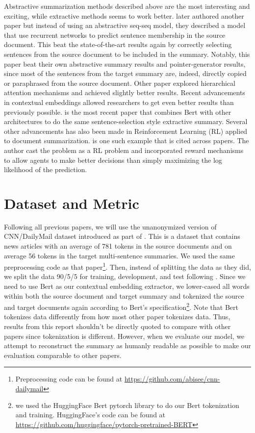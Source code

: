 \documentclass[11pt,a4paper]{article}
\begin{document}
Abstractive summarization methods described above are the most interesting and exciting, while extractive methods seems to work better.  \citet{SummaRuNNer} later authored another paper but instead of using an abstractive seq-seq model, they described a model that use recurrent networks to predict sentence membership in the source document. This beat the state-of-the-art results again by correctly selecting sentences from the source document to be included in the summary. Notably, this paper beat their own abstractive summary results and pointer-generator results, since most of the sentences from the target summary are, indeed, directly copied or paraphrased from the source document. Other paper explored hierarchical attention mechanisms \cite{al2018hierarchical} and achieved slightly better results. Recent advancements in contextual embeddings allowed researchers to get even better results than previously possible. \citet{bert-sum} is the most recent paper that combines Bert with other architectures to do the same sentence-selection style extractive summary. Several other advancements has also been made in Reinforcement Learning (RL) applied to document summarization. \citet{dca} is one such example that is cited across papers. The author cast the problem as a RL problem and incorporated reward mechanisms to allow agents to make better decisions than simply maximizing the log likelihood of the prediction.


\section{Dataset and Metric}
Following all previous papers, we will use the unanonymized version of CNN/DailyMail dataset introduced as part of \citet{pointer-generator}. This is a dataset that contains news articles with an average of 781 tokens in the source documents and on average 56 tokens in the target multi-sentence summaries. We used the same preprocessing code as that paper\footnote{Preprocessing code can be found at \url{https://github.com/abisee/cnn-dailymail}}. Then, instead of splitting the data as they did, we split the data 90/5/5 for training, development, and test following \citet{bert-sum}. Since we need to use Bert as our contextual embedding extractor, we lower-cased all words within both the source document and target summary and tokenized the source and target documents again according to Bert's specification\footnote{we used the HuggingFace Bert pytorch library to do our Bert tokenization and training. HuggingFace's code can be found at \url{https://github.com/huggingface/pytorch-pretrained-BERT}}. Note that Bert tokenizes data differently from how most other paper tokenizes data. Thus, results from this report shouldn't be directly quoted to compare with other papers since tokenization is different. However, when we evaluate our model, we attempt to reconstruct the summary as humanly readable as possible to make our evaluation comparable to other papers.
\end{document}
